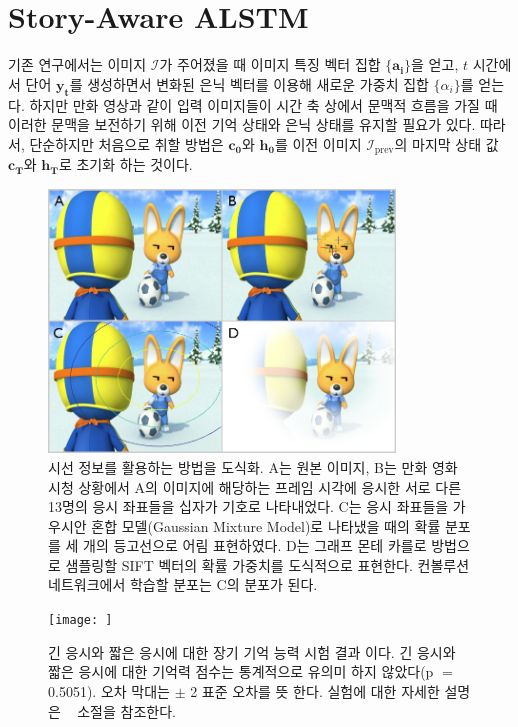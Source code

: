 \documentclass{kcc}
\begin{document}
\section{Story-Aware ALSTM}

기존 연구\cite{Xu2015}에서는 이미지 $\mathcal{I}$가 주어졌을 때 이미지 특징 벡터 집합 $\{\mathbf{a_i}\}$을 얻고, $t$ 시간에서 단어 $\mathbf{y_t}$를 생성하면서 변화된 은닉 벡터를 이용해 새로운 가중치 집합 $\{\alpha_i\}$를 얻는다. 하지만 만화 영상과 같이 입력 이미지들이 시간 축 상에서 문맥적 흐름을 가질 때 이러한 문맥을 보전하기 위해 이전 기억 상태와 은닉 상태를 유지할 필요가 있다. 따라서, 단순하지만 처음으로 취할 방법은 $\mathbf{c_0}$와 $\mathbf{h_0}$를 이전 이미지 $\mathcal{I}_{\text{prev}}$의 마지막 상태 값 $\mathbf{c_T}$와 $\mathbf{h_T}$로 초기화 하는 것이다.






\begin{figure}
  \centerline{\includegraphics[width=92mm,height=70mm]{eps/sel_fig2.png}}
  \caption{시선 정보를 활용하는 방법을 도식화. A는 원본 이미지, B는 만화 영화 시청 상황에서 A의 이미지에 해당하는 프레임 시각에 응시한 서로 다른 13명의 응시 좌표들을 십자가 기호로 나타내었다. C는 응시 좌표들을 가우시안 혼합 모델(Gaussian Mixture Model)로 나타냈을 때의 확률 분포를 세 개의 등고선으로 어림 표현하였다. D는 그래프 몬테 카를로 방법으로 샘플링할 SIFT 벡터의 확률 가중치를 도식적으로 표현한다. 컨볼루션 네트워크에서 학습할 분포는 C의 분포가 된다.}
  \label{fig:selective}
\end{figure}

\iffalse
\begin{figure}
  \centerline{\texttt{[image: ]}}
  \caption{긴 응시와 짧은 응시에 대한 장기 기억 능력 시험 결과 이다. 긴 응시와 짧은 응시에 대한 기억력 점수는 통계적으로 유의미 하지 않았다(p $=$ 0.5051). 오차 막대는 $\pm$ 2 표준 오차를 뜻 한다. 실험에 대한 자세한 설명은 ~ 소절을 참조한다.}
  \label{fig:memtest-leng}
\end{figure}
\end{document}
